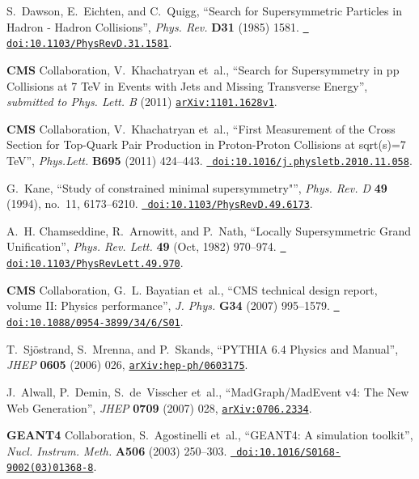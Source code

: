 \begin{thebibliography}{10}
S.~Dawson, E.~Eichten, and C.~Quigg, ``{Search for Supersymmetric Particles in
  Hadron - Hadron Collisions}'', {\em Phys. Rev.} {\bf D31} (1985) 1581.
  \href{http://dx.doi.org/10.1103/PhysRevD.31.1581}{{\tt
  doi:10.1103/PhysRevD.31.1581}}.

{\bf CMS} Collaboration, V.~Khachatryan {et~al.}, ``Search for Supersymmetry in
  pp Collisions at 7 TeV in Events with Jets and Missing Transverse Energy'',
  {\em submitted to Phys. Lett. B} (2011)
  \href{http://www.arXiv.org/abs/1101.1628v1}{{\tt arXiv:1101.1628v1}}.

{\bf CMS} Collaboration, V.~Khachatryan {et~al.}, ``{First Measurement of the
  Cross Section for Top-Quark Pair Production in Proton-Proton Collisions at
  sqrt(s)=7 TeV}'', {\em Phys.Lett.} {\bf B695} (2011) 424--443.
  \href{http://dx.doi.org/10.1016/j.physletb.2010.11.058}{{\tt
  doi:10.1016/j.physletb.2010.11.058}}.

G.~Kane, ``Study of constrained minimal supersymmetry"'', {\em Phys. Rev. D}
  {\bf 49} (1994), no.~11, 6173--6210.
  \href{http://dx.doi.org/10.1103/PhysRevD.49.6173}{{\tt
  doi:10.1103/PhysRevD.49.6173}}.

A.~H. Chamseddine, R.~Arnowitt, and P.~Nath, ``Locally Supersymmetric Grand
  Unification'', {\em Phys. Rev. Lett.} {\bf 49} (Oct, 1982) 970--974.
  \href{http://dx.doi.org/10.1103/PhysRevLett.49.970}{{\tt
  doi:10.1103/PhysRevLett.49.970}}.

{\bf CMS} Collaboration, G.~L. Bayatian {et~al.}, ``{CMS technical design
  report, volume II: Physics performance}'', {\em J. Phys.} {\bf G34} (2007)
995--1579.
  \href{http://dx.doi.org/10.1088/0954-3899/34/6/S01}{{\tt
  doi:10.1088/0954-3899/34/6/S01}}.



T.~Sj\"ostrand, S.~Mrenna, and P.~Skands, ``PYTHIA 6.4 Physics and Manual'',
  {\em JHEP} {\bf 0605} (2006) 026,
  \href{http://www.arXiv.org/abs/hep-ph/0603175}{{\tt arXiv:hep-ph/0603175}}.

J.~Alwall, P.~Demin, S.~de~Visscher{ et~al.}, ``MadGraph/MadEvent v4: The New
  Web Generation'', {\em JHEP} {\bf 0709} (2007) 028,
  \href{http://www.arXiv.org/abs/0706.2334}{{\tt arXiv:0706.2334}}.

{\bf GEANT4} Collaboration, S.~Agostinelli {et~al.}, ``{GEANT4: A simulation
  toolkit}'', {\em Nucl. Instrum. Meth.} {\bf A506} (2003)
250--303.
  \href{http://dx.doi.org/10.1016/S0168-9002(03)01368-8}{{\tt
  doi:10.1016/S0168-9002(03)01368-8}}.


\end{thebibliography}
